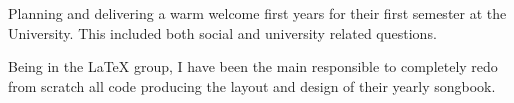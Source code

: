 Planning and delivering a warm welcome first years for their first semester
at the University. This included both social and university related questions.

\medskip

Being in the LaTeX group, I have been the main responsible to completely redo
from scratch all code producing the layout and design of their yearly songbook.
